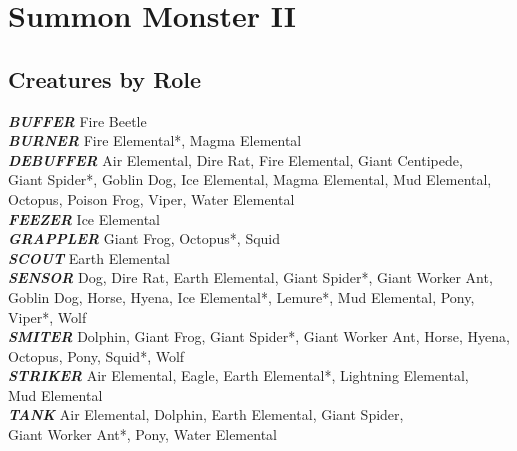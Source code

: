 \newpage

\def \levelnminusonenumsummons{1d3}
\def \levelnnumsummons{1}

\chapter{Summon Monster II}
\newpage

\section{Creatures by Role}

\vspace{5pt}

\textbf{\textit{BUFFER}} Fire Beetle \\

\textbf{\textit{BURNER}} Fire Elemental*, Magma Elemental \\

\textbf{\textit{DEBUFFER}} Air Elemental, Dire Rat, Fire Elemental, Giant Centipede, \\ Giant Spider*, Goblin Dog, Ice Elemental, Magma Elemental, Mud Elemental, Octopus, Poison Frog, Viper, Water Elemental \\

\textbf{\textit{FEEZER}} Ice Elemental \\

\textbf{\textit{GRAPPLER}} Giant Frog, Octopus*, Squid \\

\textbf{\textit{SCOUT}} Earth Elemental \\

\textbf{\textit{SENSOR}} Dog, Dire Rat, Earth Elemental, Giant Spider*, Giant Worker Ant, Goblin Dog, Horse, Hyena, Ice Elemental*, Lemure*, Mud Elemental, Pony, Viper*, Wolf \\

\textbf{\textit{SMITER}}  Dolphin, Giant Frog, Giant Spider*, Giant Worker Ant, Horse, Hyena, Octopus, Pony, Squid*, Wolf \\

\textbf{\textit{STRIKER}} Air Elemental, Eagle, Earth Elemental*, Lightning Elemental, \\ Mud Elemental \\

\textbf{\textit{TANK}} Air Elemental, Dolphin, Earth Elemental, Giant Spider, \\ Giant Worker Ant*, Pony, Water Elemental \\

